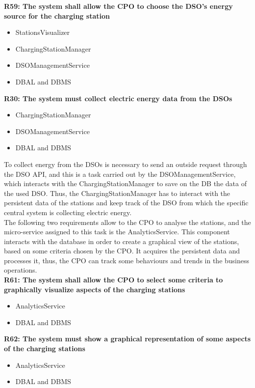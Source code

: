 \textbf{R59: The system shall allow the CPO to choose the DSO's energy source for the charging station}
\begin{itemize}
    \item StationsVisualizer
    \item ChargingStationManager
    \item DSOManagementService
    \item DBAL and DBMS
\end{itemize}

\textbf{R30: The system must collect electric energy data from the DSOs}
\begin{itemize}
    \item ChargingStationManager
    \item DSOManagementService
    \item DBAL and DBMS
\end{itemize}
To collect energy from the DSOs is necessary to send an outside request through the DSO API, and this is a task carried out by the DSOManagementService, which interacts with the ChargingStationManager to save on the DB the data of the used DSO. Thus, the ChargingStationManager has to interact with the persistent data of the stations and keep track of the DSO from which the specific central system is collecting electric energy.\\
The following two requirements allow to the CPO to analyse the stations, and the micro-service assigned to this task is the AnalyticsService. This component interacts with the database in order to create a graphical view of the stations, based on some criteria chosen by the CPO. It acquires the persistent data and processes it, thus, the CPO can track some behaviours and trends in the business operations.\\
\textbf{R61: The system shall allow the CPO to select some criteria to graphically visualize aspects of the charging stations}
\begin{itemize}
    \item AnalyticsService
    \item DBAL and DBMS
\end{itemize}

\textbf{R62: The system must show a graphical representation of some aspects of the charging stations}
\begin{itemize}
     \item AnalyticsService
    \item DBAL and DBMS
\end{itemize}
\vspace{1.5cm}

